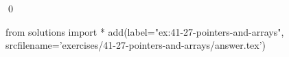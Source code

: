 
\begin{ex}
  \label{ex:41-27-pointers-and-arrays}
  
  \qed
\end{ex}
\begin{python0}
from solutions import *
add(label="ex:41-27-pointers-and-arrays",
    srcfilename='exercises/41-27-pointers-and-arrays/answer.tex')
\end{python0}
